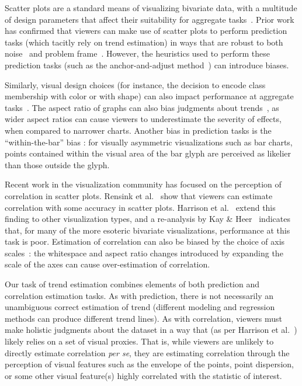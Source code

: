 \documentclass{sigchi}
\begin{document}
Scatter plots are a standard means of visualizing bivariate data, with a multitude of design parameters that affect their suitability for aggregate tasks~\cite{cleveland1984many}. Prior work has confirmed that viewers can make use of scatter plots to perform prediction tasks (which tacitly rely on trend estimation) in ways that are robust to both noise~\cite{harvey1997effects} and problem frame~\cite{lewandowsky2011popular}. However, the heuristics used to perform these prediction tasks (such as the anchor-and-adjust method~\cite{bolger1993context}) can introduce biases.

Similarly, visual design choices (for instance, the decision to encode class membership with color or with shape) can also impact performance at aggregate tasks~\cite{gleicher2013perception,lewandowsky1989discriminating}. The aspect ratio of graphs can also bias judgments about trends~\cite{beattie2002impact}, as wider aspect ratios can cause viewers to underestimate the severity of effects, when compared to narrower charts. Another bias in prediction tasks is the ``within-the-bar'' bias \cite{newman2012bar}: for visually asymmetric visualizations such as bar charts, points contained within the visual area of the bar glyph are perceived as likelier than those outside the glyph.

Recent work in the visualization community has focused on the perception of correlation in scatter plots. Rensink et al.~\cite{rensink2010perception} show that viewers can estimate correlation with some accuracy in scatter plots. Harrison et al.~\cite{harrison2014ranking} extend this finding to other visualization types, and a re-analysis by Kay \& Heer~\cite{kay2016beyond} indicates that, for many of the more esoteric bivariate visualizations, performance at this task is poor. Estimation of correlation can also be biased by the choice of axis scales~\cite{cleveland1982variables}: the whitespace and aspect ratio changes introduced by expanding the scale of the axes can cause over-estimation of correlation.

Our task of trend estimation combines elements of both prediction and correlation estimation tasks. As with prediction, there is not necessarily an unambiguous correct estimation of trend (different modeling and regression methods can produce different trend lines). As with correlation, viewers must make holistic judgments about the dataset in a way that (as per Harrison et al.~\cite{harrison2014ranking}) likely relies on a set of visual proxies. That is, while viewers are unlikely to directly estimate correlation \emph{per se}, they are estimating correlation through the perception of visual features such as the envelope of the points, point dispersion, or some other visual feature(s) highly correlated with the statistic of interest.
\end{document}
